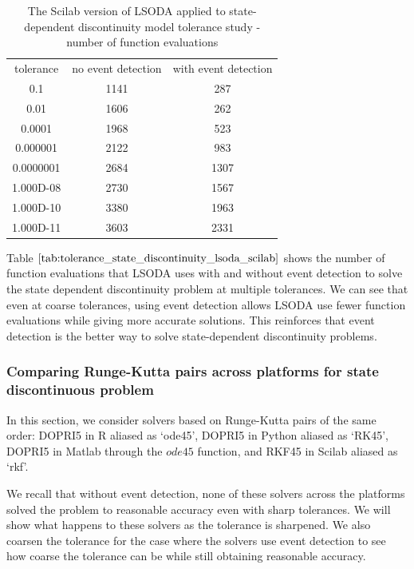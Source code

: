 \begin{table}[h]
\caption {The Scilab version of LSODA applied to state-dependent discontinuity model tolerance study - number of function evaluations} \label{tab:tolerance_state_discontinuity_lsoda_scilab} 
\begin{center}
\begin{tabular}{ c c c }
tolerance & no event detection & with event detection \\
0.1 & 1141 & 287 \\
0.01 & 1606 & 262 \\
0.0001 & 1968 & 523 \\
0.000001 & 2122 & 983 \\
0.0000001 & 2684 & 1307 \\
1.000D-08 & 2730 & 1567 \\
1.000D-10 & 3380 & 1963 \\
1.000D-11 & 3603 & 2331 \\
\end{tabular}
\end{center}
\end{table}

Table $\ref{tab:tolerance_state_discontinuity_lsoda_scilab}$ shows the number of function evaluations that LSODA uses with and without event detection to solve the state dependent discontinuity problem at multiple tolerances. We can see that even at coarse tolerances, using event detection allows LSODA use fewer function evaluations while giving more accurate solutions. This reinforces that event detection is the better way to solve state-dependent discontinuity problems. 

\subsubsection{Comparing Runge-Kutta pairs across platforms for state discontinuous problem}
In this section, we consider solvers based on Runge-Kutta pairs of the same order: DOPRI5 in R aliased as `ode45', DOPRI5 in Python aliased as `RK45', DOPRI5 in Matlab through the $ode45$ function, and RKF45 in Scilab aliased as `rkf'.

We recall that without event detection, none of these solvers across the platforms solved the problem to reasonable accuracy even with sharp tolerances. We will show what happens to these solvers as the tolerance is sharpened. We also coarsen the tolerance for the case where the solvers use event detection to see how coarse the tolerance can be while still obtaining reasonable accuracy.

